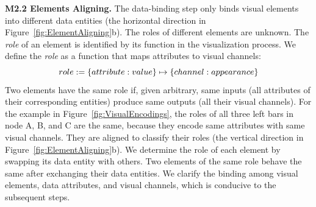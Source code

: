 {\bf M2.2 Elements Aligning.}
The data-binding step only binds visual elements into different data entities (the horizontal direction in Figure~\ref{fig:ElementAligning}b).
The roles of different elements are unknown.
The \textit{role} of an element is identified by its function in the visualization process.
We define the \textit{role} as a function that maps attributes to visual channels:
\begin{equation}
    \abovedisplayskip=5pt
    \abovedisplayshortskip=5pt
    \belowdisplayskip=5pt
    \belowdisplayshortskip=5pt
    role :=  \{attribute: value\} \mapsto \{channel: appearance\}
\end{equation}
Two elements have the same role if, given arbitrary, same inputs (all attributes of their corresponding entities) produce same outputs (all their visual channels).
For the example in Figure~\ref{fig:VisualEncodings}, 
the roles of all three left bars in node A, B, and C are the same,
because they encode same attributes with same visual channels.
They are aligned to classify their roles (the vertical direction in Figure~\ref{fig:ElementAligning}b).
We determine the role of each element by swapping its data entity with others. Two elements of the same role behave the same after exchanging their data entities.
We clarify the binding among visual elements, data attributes, and visual channels, which is conducive to the subsequent steps.


